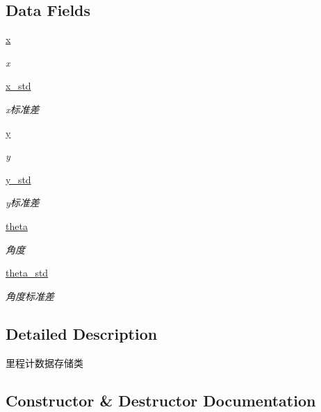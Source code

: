 \subsection*{Data Fields}
\begin{DoxyCompactItemize}
\item 
\hyperlink{classselect___a_1_1_odom__unit_a99bab6d1ef6426e683f4fb1992e04c06}{x}
\begin{DoxyCompactList}\small\item\em x \end{DoxyCompactList}\item 
\hyperlink{classselect___a_1_1_odom__unit_ac019780c925a430ad65c3feaec7d7935}{x\+\_\+std}
\begin{DoxyCompactList}\small\item\em x标准差 \end{DoxyCompactList}\item 
\hyperlink{classselect___a_1_1_odom__unit_a138e109615cd6f22dcc3365fbb4d13db}{y}
\begin{DoxyCompactList}\small\item\em y \end{DoxyCompactList}\item 
\hyperlink{classselect___a_1_1_odom__unit_a61b76aa36fddf1c7238113d4bd77e6fa}{y\+\_\+std}
\begin{DoxyCompactList}\small\item\em y标准差 \end{DoxyCompactList}\item 
\hyperlink{classselect___a_1_1_odom__unit_af5c3110f57239be493ea22a4d76c69d4}{theta}
\begin{DoxyCompactList}\small\item\em 角度 \end{DoxyCompactList}\item 
\hyperlink{classselect___a_1_1_odom__unit_acbd8f5ab9241cff5a8d37b9e2e579a7d}{theta\+\_\+std}
\begin{DoxyCompactList}\small\item\em 角度标准差 \end{DoxyCompactList}\end{DoxyCompactItemize}


\subsection{Detailed Description}
里程计数据存储类 



\subsection{Constructor \& Destructor Documentation}
\mbox{\label{classselect___a_1_1_odom__unit_afcb577ae918dd1a71159766a06631865}} 
